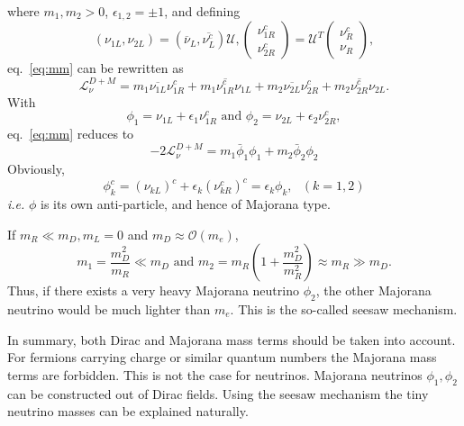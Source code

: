 where $m_{1}, m_{2} > 0$, $\epsilon_{1,2} = \pm 1$, and defining
\begin{equation}
  \label{eq:mvet}
  (\nu_{1L}, \nu_{2L}) = \left( \overline{\nu}_{L},             \overline{\nu^{c}_{L}} \right) \mathcal{U},
  \left(\begin{array}{c} \nu^{c}_{1R} \\            
      \nu^{c}_{2R}\end{array}\right) = \mathcal{U}^{T}
  \left(\begin{array}{c} \nu^{c}_{R} \\ \nu_{R} \end{array}\right),
\end{equation}
eq.~\ref{eq:mm} can be rewritten as
\begin{equation}
  \label{eq:m12}
  \mathcal{L}_{\nu}^{D+M} = m_{1}\overline{\nu_{1L}}\nu^{c}_{1R} +  
  m_{1}\overline{\nu^{c}_{1R}}\nu_{1L} +
  m_{2}\overline{\nu_{2L}}\nu^{c}_{2R} +  
  m_{2}\overline{\nu^{c}_{2R}}\nu_{2L}.
\end{equation}
With
\begin{equation}
  \label{eq:mafi}
  \phi_{1} = \nu_{1L} + \epsilon_{1}\nu^{c}_{1R}
  \mbox{\ \ \ and \ \ \ }
  \phi_{2} = \nu_{2L} + \epsilon_{2}\nu^{c}_{2R},
\end{equation}
eq.~\ref{eq:mm} reduces to
\begin{equation}
  \label{eq:mv}
  -2\mathcal{L}_{\nu}^{D+M} = m_{1}\bar{\phi}_{1}\phi_{1} +
  m_{2}\bar{\phi}_{2}\phi_{2}
\end{equation}
Obviously,
\begin{equation}
  \label{eq:mach}
  \phi^{c}_{k} = (\nu_{kL})^{c} + \epsilon_{k}(\nu^{c}_{kR})^{c} =
\epsilon_{k}\phi_{k}, ~~~ (k=1,2)
\end{equation}
\textit{i.e.} $\phi$ is its own anti-particle, and hence of Majorana type.

If $m_{R} \ll m_{D}, m_{L}=0$ and $m_{D} \approx \mathcal{O}(m_{e})$,
\begin{equation}
  \label{eq:seesaw}
  m_{1} = \frac{m^{2}_{D}}{m_{R}}\ll m_{D}  \mbox{\ \ \ and \ \ \ }  
  m_{2} = m_{R}(1+\frac{m^{2}_{D}}{m^{2}_{R}}) \approx m_{R} \gg m_{D}.
\end{equation}
Thus, if there exists a very heavy Majorana neutrino $\phi_2$, the other Majorana neutrino would be much lighter than $m_e$. This is the so-called seesaw mechanism.

In summary, both Dirac and Majorana mass terms should be taken into account. For fermions carrying charge or similar quantum numbers the Majorana mass terms are forbidden. This is not the case for neutrinos. Majorana neutrinos $\phi_{1}, \phi_{2}$ can be constructed out of Dirac fields. Using the seesaw mechanism the tiny neutrino masses can be explained naturally.

